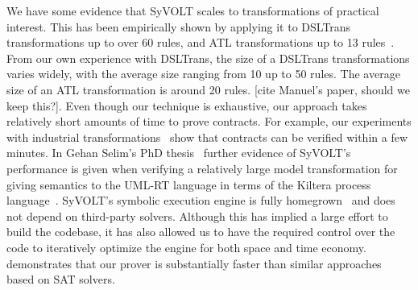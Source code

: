 We have some evidence that SyVOLT scales to transformations of practical
interest. This has been empirically shown by applying it to DSLTrans
transformations up to over 60 rules, and ATL transformations up to 13
rules~\cite{Oakes2016}. From our own experience with DSLTrans, the size of a
DSLTrans transformations varies widely, with the average size ranging from 10 up
to 50 rules. The average size of an ATL transformation is around 20 rules. [cite
Manuel's paper, should we keep this?]. Even though our technique is exhaustive, our
approach takes relatively short amounts of time to prove contracts. For example,
our experiments with industrial transformations~\cite{Oakes2016} show that contracts
can be verified within a few minutes. In Gehan Selim's PhD
thesis~\cite{Selim2015} further evidence of SyVOLT's performance is given when
verifying a relatively large model transformation for giving semantics to the
UML-RT language in terms of the Kiltera process language~\cite{PosseDingel2014}.
SyVOLT's symbolic execution engine is fully
homegrown~\cite{LucioVang} and does not depend on third-party solvers. Although this has implied
a large effort to build the codebase, it has also allowed us to have the
required control over the code to iteratively optimize the engine for both space
and time economy.
\cite{Selim2014} demonstrates that our prover is substantially faster than
similar approaches based on SAT solvers.